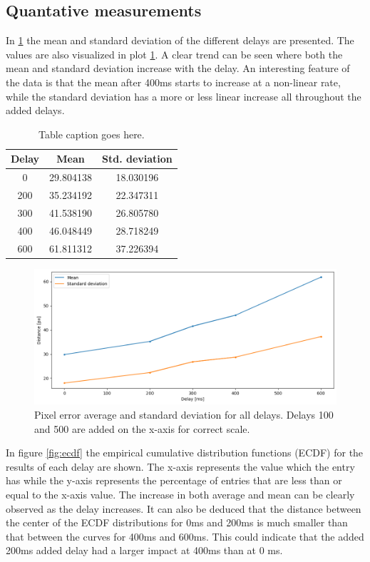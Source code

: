 \documentclass[nofilelist]{cslthse-msc}
\begin{document}
\subsection{Quantative measurements}
In \ref{tab:averages} the mean and standard deviation of the different delays are presented. The values are also visualized in plot \ref{fig:avg-std}. A clear trend can be seen where both the mean and standard deviation increase with the delay. An interesting feature of the data is that the mean after 400ms starts to increase at a non-linear rate, while the standard deviation has a more or less linear increase all throughout the added delays.

\begin{table}[ht]
   \centering
   \begin{tabular}{|c|c|c|}
   \hline
   \textbf{Delay} & \textbf{ Mean} & \textbf{Std. deviation} \\
   \hline
   0 & 29.804138 & 18.030196 \\ \hline
   200 & 35.234192 & 22.347311 \\ \hline
   300 & 41.538190 & 26.805780 \\ \hline
   400 & 46.048449 & 28.718249 \\ \hline
   600 & 61.811312 & 37.226394 \\ \hline
   \end{tabular}
   \caption{Table caption goes here.}
   \label{tab:averages}
\end{table}


\begin{figure}[!hbt]
   \centering
   \includegraphics[scale=0.5]{images/avg-std.png} 
   \caption{Pixel error average and standard deviation for all delays. Delays 100 and 500 are added on the x-axis for correct scale.}
   \label{fig:avg-std}
\end{figure}

In figure \ref{fig:ecdf} the empirical cumulative distribution functions (ECDF) for the results of each delay are shown. The x-axis represents the value which the entry has while the y-axis represents the percentage of entries that are less than or equal to the x-axis value. The increase in both average and mean can be clearly observed as the delay increases. It can also be deduced that the distance between the center of the ECDF distributions for 0ms and 200ms is much smaller than that between the curves for 400ms and 600ms. This could indicate that the added 200ms added delay had a larger impact at 400ms than at 0 ms.
\end{document}
